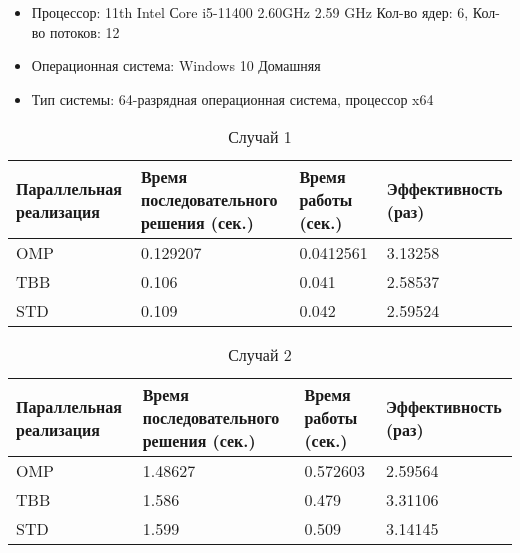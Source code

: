 \documentclass{report}
\begin{document}
\begin{itemize}
    \item Процессор: 11th Intel Сore i5-11400 2.60GHz 2.59 GHz Кол-во ядер: 6, Кол-во потоков: 12
    \item Операционная система: Windows 10 Домашняя
    \item Тип системы: 64-разрядная операционная система, процессор x64
\end{itemize}
\par\text{ }
\begin{table}[!h]
    \centering
    \begin{tabular}{| l | l | l | l |}
    \hline
    \scriptsize{Параллельная реализация} & \scriptsize{Время последовательного решения (сек.)} & \scriptsize{Время работы (сек.)} & \scriptsize{Эффективность (раз)} \\ \hline
    OMP   &   0.129207    &   0.0412561 &   3.13258  \\ \hline
    TBB   &   0.106    &   0.041   &   2.58537  \\ \hline
    STD   &   0.109   &   0.042   &   2.59524  \\ \hline
    \end{tabular}
    \caption{Случай 1}
\end{table}

\begin{table}[!h]
    \centering
    \begin{tabular}{| l | l | l | l |}
    \hline
    \scriptsize{Параллельная реализация} & \scriptsize{Время последовательного решения (сек.)} & \scriptsize{Время работы (сек.)} & \scriptsize{Эффективность (раз)} \\ \hline
    OMP   &   1.48627   &   0.572603   &   2.59564  \\ \hline
    TBB   &   1.586    &   0.479   &   3.31106  \\ \hline
    STD   &   1.599   &   0.509   &   3.14145  \\ \hline
    \end{tabular}
    \caption{Случай 2}
\end{table}
\end{document}
